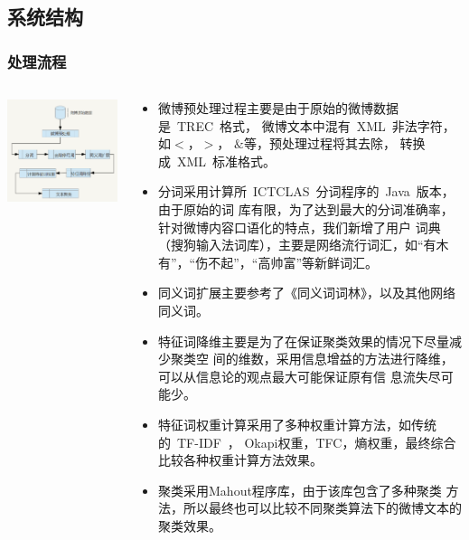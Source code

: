 \documentclass[CJKutf8, table]{beamer}
\begin{document}
\begin{CJK}{UTF8}{gbsn}
\subsection{系统结构}
\begin{frame}
  \frametitle{处理流程}
  \begin{columns}
      \includegraphics[width=1\textwidth,keepaspectratio]{weibo-mining-procedure.png}
    \pause
    \begin{tiny}
    \begin{itemize}
    \item<2- | alert@2> {微博预处理过程主要是由于原始的微博数据是~TREC~格式，
      微博文本中混有~XML~非法字符，如$<$，$>$， $\&$等，预处理过程将其去除，
      转换成~XML~标准格式。}
    
    \item<3-|alert@3> {分词采用计算所~ICTCLAS~分词程序的~Java~版本，由于原始的词
      库有限，为了达到最大的分词准确率，针对微博内容口语化的特点，我们新增了用户
      词典（搜狗输入法词库），主要是网络流行词汇，如``有木有''，``伤不起''，``高帅富''等新鲜词汇。}
    
    \item<4-|alert@4> {同义词扩展主要参考了《同义词词林》，以及其他网络同义词。}

    \item<5-|alert@5> {特征词降维主要是为了在保证聚类效果的情况下尽量减少聚类空
      间的维数，采用信息增益的方法进行降维，可以从信息论的观点最大可能保证原有信
      息流失尽可能少。}
    \item<6-|alert@6>{特征词权重计算采用了多种权重计算方法，如传统的~TF-IDF~，
      Okapi权重，TFC，熵权重，最终综合比较各种权重计算方法效果。}
    \item<7-|alert@7>{聚类采用Mahout程序库，由于该库包含了多种聚类
      方法，所以最终也可以比较不同聚类算法下的微博文本的聚类效果。}


\end{itemize}
\end{tiny}
\end{columns}
\end{frame}
\end{CJK}
\end{document}
